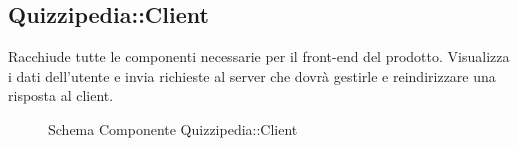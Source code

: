 \subsection{Quizzipedia::Client}
Racchiude tutte le componenti necessarie per il front-end del prodotto. Visualizza i dati dell'utente e invia richieste al server che dovrà gestirle e reindirizzare una risposta al client.
\begin{figure}[H]
\centering
\noindent{}
\caption[Schema Componente Client]{Schema Componente Quizzipedia::Client}
\end{figure}
